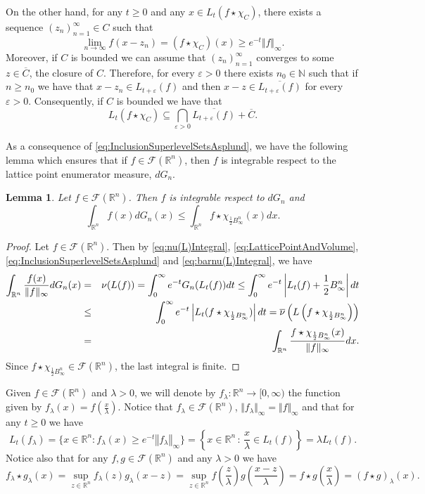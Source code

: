 \documentclass{amsart}
\newcommand{\R}{\mathbb R}
\newcommand{\N}{\mathbb N}
\newcommand{\norma}[1]{\left\Vert#1\right\Vert}
\newtheorem{lemma}{Lemma}[section]
\theoremstyle{remark}
\theoremstyle{definition}
\numberwithin{equation}{section}
\begin{document}
On the other hand, for any $t\geq0$ and any $x\in L_t(f\star\chi_C)$, there exists a sequence $(z_n)_{n=1}^\infty\in C$ such that
$$
\lim_{n\to\infty}f(x-z_n)=(f\star\chi_C)(x)\geq e^{-t}\Vert f\Vert_\infty.
$$
Moreover, if $C$ is bounded we can assume that $(z_n)_{n=1}^\infty$ converges to some $z\in\overline{C}$, the closure of $C$. Therefore, for every $\varepsilon>0$ there exists $n_0\in\N$ such that if $n\geq n_0$ we have that $x-z_n\in L_{t+\varepsilon}(f)$ and then $x-z\in \overline{L_{t+\varepsilon}(f)}$ for every $\varepsilon>0$. Consequently, if $C$ is bounded we have that
\begin{equation}\label{eq:InverseInclusionSuperLevelSetsAsplund}
L_t(f\star\chi_C)\subseteq\bigcap_{\varepsilon>0}\overline{L_{t+\varepsilon}(f)}+\overline{C}.
\end{equation}

As a consequence of \eqref{eq:InclusionSuperlevelSetsAsplund}, we have the following lemma which ensures that if $f\in\mathcal{F}(\R^n)$, then $f$ is integrable respect to the lattice point enumerator measure, $dG_n$.

\begin{lemma}\label{lem:Integrability}
Let $f\in\mathcal{F}(\R^n)$. Then $f$ is integrable respect to $dG_n$ and
$$
\int_{\R^n}f(x)dG_n(x)\leq \int_{\R^n}f\star\chi_{\frac{1}{2}B_\infty^n}(x)dx.
$$
\end{lemma}

\begin{proof}
Let $f\in\mathcal{F}(\R^n)$. Then by \eqref{eq:nu(L)Integral}, \eqref{eq:LatticePointAndVolume}, \eqref{eq:InclusionSuperlevelSetsAsplund} and \eqref{eq:barnu(L)Integral}, we have
\begin{eqnarray*}
\int_{\R^n}\frac{f(x)}{\Vert f\Vert_\infty}dG_n(x)&=&\nu(L(f))=\int_0^\infty e^{-t} G_n(L_t(f))dt\leq\int_0^\infty e^{-t}\left|L_t(f)+\frac{1}{2}B_\infty^n\right|dt\cr
&\leq&\int_0^\infty e^{-t}\left|L_t(f\star\chi_{\frac{1}{2}B_\infty^n})\right|dt=\overline{\nu}\left(L\left(f\star\chi_{\frac{1}{2}B_\infty^n}\right)\right)\cr
&=&\int_{\R^n}\frac{f\star\chi_{\frac{1}{2}B_\infty^n}(x)}{\Vert f\Vert_\infty}dx.
\end{eqnarray*}
Since $f\star\chi_{\frac{1}{2}B_\infty^n} \in\mathcal{F}(\R^n)$, the last integral is finite.
\end{proof}

Given $f\in\mathcal{F}(\R^n)$ and $\lambda>0$, we will denote by $f_\lambda:\R^n\to[0,\infty)$ the function given by $f_\lambda(x)=f\left(\frac{x}{\lambda}\right)$. Notice that $f_{\lambda} \in \mathcal{F}(\R^n)$, $\Vert f_\lambda\Vert_\infty=\Vert f\Vert_\infty$ and that for any $t\geq 0$ we have
$$
L_t(f_\lambda)=\{ x \in \R^n : f_\lambda(x) \geq e^{-t} \norma{f_\lambda}_{\infty} \}=\left\{x\in\R^n\,:\,\frac{x}{\lambda}\in L_t(f)\right\}=\lambda L_t(f).
$$
Notice also that for any $f, g\in\mathcal{F}(\R^n)$ and any $\lambda>0$ we have
\begin{equation}\label{eq:IdentityLambda}
f_{\lambda} \star g_{\lambda} (x)= \sup_{z\in\R^n}f_{\lambda}(z) g_{\lambda}(x-z) = \sup_{z\in\R^n}f\left(\frac{z}{\lambda} \right) g\left(\frac{x-z}{\lambda} \right) = f \star g \left( \frac{x}{\lambda} \right)=(f\star g)_\lambda(x).
\end{equation}
\end{document}
